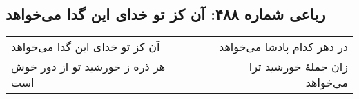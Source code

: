 \begin{center}
\section*{رباعی شماره ۴۸۸: آن کز تو خدای این گدا می‌خواهد}
\label{sec:0488}
\begin{longtable}{l p{0.5cm} r}
آن کز تو خدای این گدا می‌خواهد
&&
در دهر کدام پادشا می‌خواهد
\\
هر ذره ز خورشید تو از دور خوش است
&&
زان جملهٔ خورشید ترا می‌خواهد
\\
\end{longtable}
\end{center}
